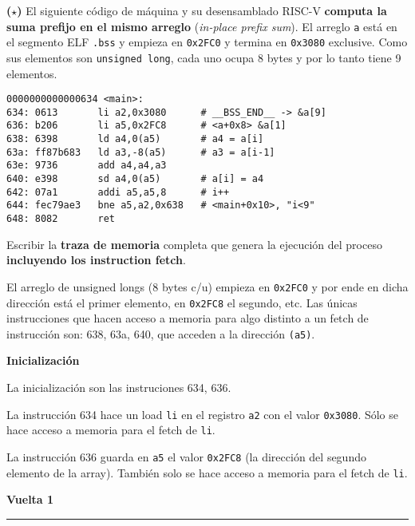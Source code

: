 \documentclass[12pt]{article}
\theoremstyle{definition}
\begin{document}
\begin{shaded}

\textbf{($\star$)} El siguiente código de máquina y su desensamblado RISC-V \textbf{computa la suma prefijo en el mismo arreglo} 
(\textit{in-place prefix sum}). El arreglo \texttt{a} está en el segmento ELF \texttt{.bss} y empieza en 
\texttt{0x2FC0} y termina en \texttt{0x3080} exclusive. Como sus elementos son \texttt{unsigned long}, 
cada uno ocupa 8 bytes y por lo tanto tiene 9 elementos.

\begin{lstlisting}[style=riscv]
0000000000000634 <main>:
634: 0613       li a2,0x3080      # __BSS_END__ -> &a[9]
636: b206       li a5,0x2FC8      # <a+0x8> &a[1]
638: 6398       ld a4,0(a5)       # a4 = a[i]
63a: ff87b683   ld a3,-8(a5)      # a3 = a[i-1]
63e: 9736       add a4,a4,a3
640: e398       sd a4,0(a5)       # a[i] = a4
642: 07a1       addi a5,a5,8      # i++
644: fec79ae3   bne a5,a2,0x638   # <main+0x10>, "i<9"
648: 8082       ret
\end{lstlisting}

\vspace{0.5cm}

Escribir la \textbf{traza de memoria} completa que genera la ejecución del proceso \textbf{incluyendo los instruction fetch}.
\end{shaded}

El arreglo de unsigned longs (8 bytes c/u) empieza en \texttt{0x2FC0} y por ende
en dicha dirección está el primer elemento, en \texttt{0x2FC8} el segundo, etc.
Las únicas instrucciones que hacen acceso a memoria para algo distinto a un
fetch de instrucción son: 638, 63a, 640, que acceden a la dirección
\texttt{(a5)}. 

\vspace{0.5cm}

\noindent
\textbf{Inicialización} 

La inicialización son las instruciones 634, 636. 

La instrucción 634 hace un load
\texttt{li} en el registro \texttt{a2} con el valor \texttt{0x3080}. Sólo se
hace acceso a memoria para el fetch de \texttt{li}.

La instrucción 636 guarda en \texttt{a5} el valor \texttt{0x2FC8} (la dirección
del segundo elemento de la array). También solo se hace acceso a memoria para el
fetch de \texttt{li}.

\noindent
\textbf{Vuelta 1} \\
\rule{\textwidth}{0.4pt} 
\end{document}
